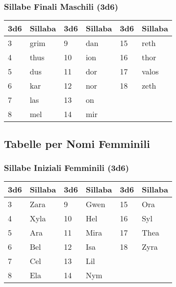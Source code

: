 \begin{multicols}{2}
{\subsubsection*{Sillabe Finali Maschili (3d6)}

\noindent\begin{tabularx}{\linewidth}{X|l|X|l|X|l}
	\toprule
\rowcolor{gray!20}\textbf{3d6} & \textbf{Sillaba} & \textbf{3d6} & \textbf{Sillaba} & \textbf{3d6} & \textbf{Sillaba} \\
\toprule
3 & grim & 9 & dan & 15 & reth \\
\rowcolor{gray!20}4 & thus & 10 & ion & 16 & thor \\
5 & dus & 11 & dor & 17 & valos \\
\rowcolor{gray!20}6 & kar & 12 & nor & 18 & zeth \\
7 & las & 13 & on & & \\
\rowcolor{gray!20}8 & mel & 14 & mir & & \\
\end{tabularx}


\subsection*{Tabelle per Nomi Femminili}

\subsubsection*{Sillabe Iniziali Femminili (3d6)}

\noindent\begin{tabularx}{\linewidth}{X|l|X|l|X|l}
	\toprule
\rowcolor{gray!20}\textbf{3d6} & \textbf{Sillaba} & \textbf{3d6} & \textbf{Sillaba} & \textbf{3d6} & \textbf{Sillaba} \\
\toprule
3 & Zara & 9 & Gwen & 15 & Ora \\
\rowcolor{gray!20}4 & Xyla & 10 & Hel & 16 & Syl \\
5 & Ara & 11 & Mira & 17 & Thea \\
\rowcolor{gray!20}6 & Bel & 12 & Isa & 18 & Zyra \\
7 & Cel & 13 & Lil & & \\
\rowcolor{gray!20}8 & Ela & 14 & Nym & & \\
\end{tabularx}

}
\end{multicols}
